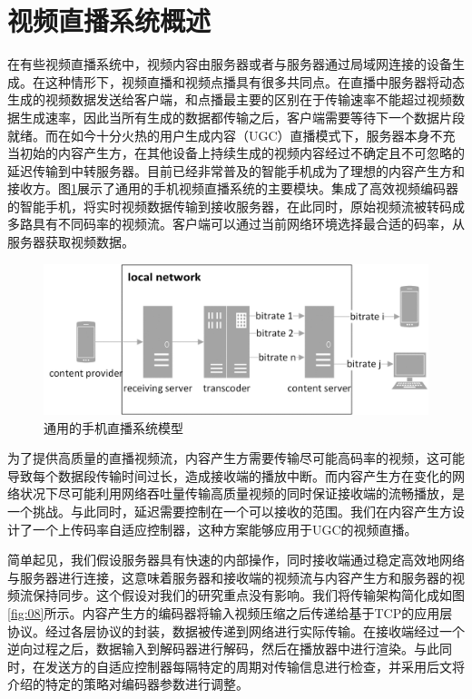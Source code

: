 \section{视频直播系统概述}

在有些视频直播系统中，视频内容由服务器或者与服务器通过局域网连接的设备生成。在这种情形下，视频直播和视频点播具有很多共同点。在直播中服务器将动态生成的视频数据发送给客户端，和点播最主要的区别在于传输速率不能超过视频数据生成速率，因此当所有生成的数据都传输之后，客户端需要等待下一个数据片段就绪\supercite{Thang2014}。而在如今十分火热的用户生成内容（UGC）直播模式下，服务器本身不充当初始的内容产生方，在其他设备上持续生成的视频内容经过不确定且不可忽略的延迟传输到中转服务器。目前已经非常普及的智能手机成为了理想的内容产生方和接收方。图\ref{fig:07}展示了通用的手机视频直播系统的主要模块。集成了高效视频编码器的智能手机，将实时视频数据传输到接收服务器，在此同时，原始视频流被转码成多路具有不同码率的视频流。客户端可以通过当前网络环境选择最合适的码率，从服务器获取视频数据。

\begin{figure}[h]
	\centering
	\includegraphics[width = 0.9\linewidth]{clip/07.png}
	\caption{通用的手机直播系统模型\label{fig:07}}
\end{figure}

为了提供高质量的直播视频流，内容产生方需要传输尽可能高码率的视频，这可能导致每个数据段传输时间过长，造成接收端的播放中断。而内容产生方在变化的网络状况下尽可能利用网络吞吐量传输高质量视频的同时保证接收端的流畅播放，是一个挑战。与此同时，延迟需要控制在一个可以接收的范围。我们在内容产生方设计了一个上传码率自适应控制器，这种方案能够应用于UGC的视频直播。

简单起见，我们假设服务器具有快速的内部操作，同时接收端通过稳定高效地网络与服务器进行连接，这意味着服务器和接收端的视频流与内容产生方和服务器的视频流保持同步。这个假设对我们的研究重点没有影响。我们将传输架构简化成如图\ref{fig:08}所示。内容产生方的编码器将输入视频压缩之后传递给基于TCP的应用层协议。经过各层协议的封装，数据被传递到网络进行实际传输。在接收端经过一个逆向过程之后，数据输入到解码器进行解码，然后在播放器中进行渲染。与此同时，在发送方的自适应控制器每隔特定的周期对传输信息进行检查，并采用后文将介绍的特定的策略对编码器参数进行调整。

